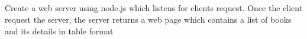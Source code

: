 \documentclass[12pt,letterpaper]{article}
\begin{document}
\subsection*{}
\begin{flushleft}
    Create a web server using node.js which listens for clients request. Once the client request the server, the server 
    returns a web page which contains a list of books and its details in table format
\end{flushleft}

\subsection*{}
\subsubsection*{}
\begin{flushleft}

\end{flushleft}

\subsubsection*{{}}
\begin{flushleft}
    
\end{flushleft}

\newpage
\end{document}
